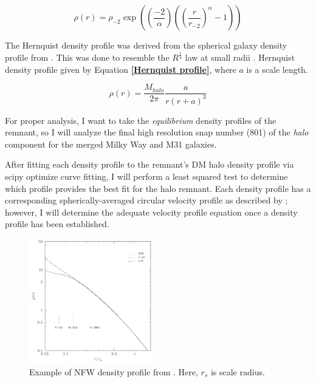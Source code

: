 \begin{equation}
    \rho(r) = \rho_{-2}\exp \left( \left( \frac{-2}{\alpha} \right) \left( \left( \frac{r}{r_{-2}} \right)^{\alpha} -1\right)\right)
    \label{Einasto profile}
\end{equation}
\smallskip

The Hernquist density profile was derived from the spherical galaxy density profile from \cite{Jaffe1983}. This was done to resemble the $R^{\frac{1}{4}}$ law at small radii \cite{Hernquist1990}. Hernquist density profile given by Equation \textbf{\ref{Hernquist profile}}, where $a$ is a scale length.

\begin{equation}
    \rho(r) = \frac{M_{halo}}{2\pi} \frac{a}{r(r+a)^{3}}
    \label{Hernquist profile}
\end{equation}
\smallskip

For proper analysis, I want to take the \textit{equilibrium} density profiles of the remnant, so I will analyze the final high resolution snap number (801) of the \textit{halo} component for the merged Milky Way and M31 galaxies.

After fitting each density profile to the remnant's DM halo density profile via scipy optimize curve fitting, I will perform a least squared test to determine which profile provides the best fit for the halo remnant. Each density profile has a corresponding spherically-averaged circular velocity profile as described by \cite{Navarro1997}; however, I will determine the adequate velocity profile equation once a density profile has been established. 

\begin{figure}
  \begin{center}
    \includegraphics[width=0.48\textwidth]{Figures/NFWdensprof.png}
  \end{center}
  \caption{Example of NFW density profile from \cite{Prada2013}. Here, $r_{s}$ is scale radius.}
  \label{NFW prof graph}
\end{figure}

